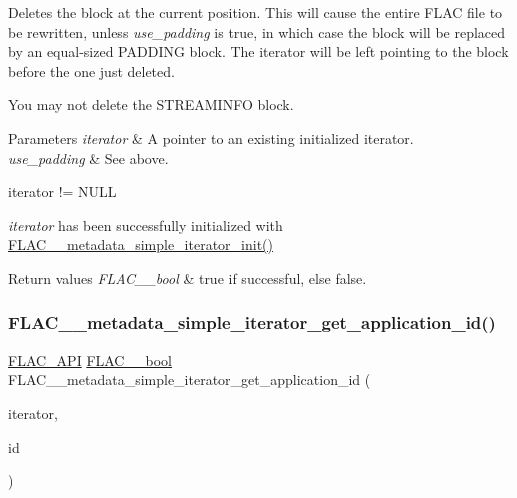 Deletes the block at the current position. This will cause the entire F\+L\+AC file to be rewritten, unless {\itshape use\+\_\+padding} is {\ttfamily true}, in which case the block will be replaced by an equal-\/sized P\+A\+D\+D\+I\+NG block. The iterator will be left pointing to the block before the one just deleted.

You may not delete the S\+T\+R\+E\+A\+M\+I\+N\+FO block.


\begin{DoxyParams}{Parameters}
{\em iterator} & A pointer to an existing initialized iterator. \\
\hline
{\em use\+\_\+padding} & See above.  
\begin{DoxyCode}
iterator != NULL 
\end{DoxyCode}
 {\itshape iterator} has been successfully initialized with \hyperlink{group__flac__metadata__level1_ga2a055cca4e6e06ae62517c8b0fa6e8a3}{F\+L\+A\+C\+\_\+\+\_\+metadata\+\_\+simple\+\_\+iterator\+\_\+init()} \\
\hline
\end{DoxyParams}

\begin{DoxyRetVals}{Return values}
{\em F\+L\+A\+C\+\_\+\+\_\+bool} & {\ttfamily true} if successful, else {\ttfamily false}. \\
\hline
\end{DoxyRetVals}
\mbox{\label{group__flac__metadata__level1_gaf2db2a96f7c60100d620a2eefb8360bc}} 
\subsubsection{\texorpdfstring{F\+L\+A\+C\+\_\+\+\_\+metadata\+\_\+simple\+\_\+iterator\+\_\+get\+\_\+application\+\_\+id()}{FLAC\_\_metadata\_simple\_iterator\_get\_application\_id()}}
{\footnotesize\ttfamily \hyperlink{group__flac__export_ga56ca07df8a23310707732b1c0007d6f5}{F\+L\+A\+C\+\_\+\+A\+PI} \hyperlink{ordinals_8h_a95103469f1cbd78b8cf250194985b34e}{F\+L\+A\+C\+\_\+\+\_\+bool} F\+L\+A\+C\+\_\+\+\_\+metadata\+\_\+simple\+\_\+iterator\+\_\+get\+\_\+application\+\_\+id (\begin{DoxyParamCaption}\item[{\hyperlink{group__flac__metadata__level1_ga6accccddbb867dfc2eece9ee3ffecb3a}{F\+L\+A\+C\+\_\+\+\_\+\+Metadata\+\_\+\+Simple\+Iterator} $\ast$}]{iterator,  }\item[{\hyperlink{ordinals_8h_a5eb569b12d5b047cdacada4d57924ee3}{F\+L\+A\+C\+\_\+\+\_\+byte} $\ast$}]{id }\end{DoxyParamCaption})}

